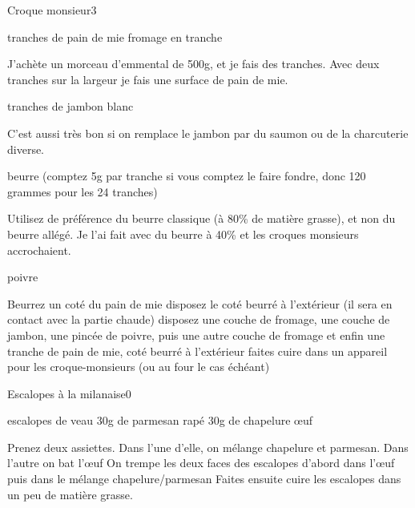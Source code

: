 \begin{recette}{Croque monsieur}{3}{}{}
\begin{ingredients}
 tranches de pain de mie
\ingredient fromage en tranche
\begin{remarque}
J'achète un morceau d'emmental de 500g, et je fais des tranches. Avec deux tranches sur la largeur je fais une surface de pain de mie.
\end{remarque}

 tranches de jambon blanc
\begin{remarque}
C'est aussi très bon si on remplace le jambon par du saumon ou de la charcuterie diverse.
\end{remarque}

\ingredient beurre (comptez 5g par tranche si vous comptez le faire fondre, donc 120 grammes pour les 24 tranches)
\begin{attention}
Utilisez de préférence du beurre classique (à 80\% de matière grasse), et non du beurre allégé. Je l'ai fait avec du beurre à 40\% et les croques monsieurs accrochaient.
\end{attention}

\ingredient poivre
\end{ingredients}

\begin{preparation}
\etape Beurrez un coté du pain de mie
\etape disposez le coté beurré à l'extérieur (il sera en contact avec la partie chaude)
\etape disposez une couche de fromage, une couche de jambon, une pincée de poivre, puis une autre couche de fromage et enfin une tranche de pain de mie, coté beurré à l'extérieur
\etape faites cuire dans un appareil pour les croque-monsieurs (ou au four le cas échéant)
\end{preparation}

\end{recette}

\begin{recette}{Escalopes à la milanaise}{0}{}{}
\begin{ingredients}
 escalopes de veau
\ingredient 30g de parmesan rapé
\ingredient 30g de chapelure
 œuf
\end{ingredients}

\begin{preparation}
\etape Prenez deux assiettes. Dans l'une d'elle, on mélange chapelure et parmesan. Dans l'autre on bat l'œuf
\etape On trempe les deux faces des escalopes d'abord dans l'œuf puis dans le mélange chapelure/parmesan
\etape Faites ensuite cuire les escalopes dans un peu de matière grasse.
\end{preparation}
\end{recette}

